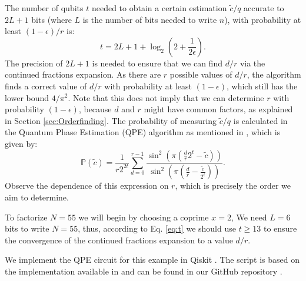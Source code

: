 \documentclass[aps,prl,twocolumn,superscriptaddress,groupedaddress]{revtex4}  %
\begin{document}
The number of qubits $t$ needed to obtain a certain estimation  $\tilde{c}/q$ accurate to $2L+1$ bits (where $L$ is the number of bits needed to write $n$), with probability at least $(1-\epsilon)/r$ is:
\begin{equation}\label{eq:t}
t=2L+1+ \log_2 \left(  2+\frac{1}{2\epsilon}\right).
\end{equation}
The precision of $2L+1$ is needed to ensure that we can find $d/r$ via the continued fractions expansion. As there are $r$ possible values of $d/r$, the algorithm finds a correct value of $d/r$  with probability at least $(1-\epsilon)$, which still has the lower bound $4/\pi^2$. Note that this does not imply that we can determine $r$ with probability $(1-\epsilon)$, because $d$ and $r$ might have common factors, as explained in Section \ref{sec:Orderfinding}. The probability of measuring $\tilde{c}/q$ is calculated in the Quantum Phase Estimation (QPE) algorithm as mentioned in \cite{Nielsen_Chuang_2010}, which is given by:
\begin{equation}
\mathbb{P}(\tilde{c})=\frac{1}{r2^{2t}}\sum_{d=0}^{r-1} \frac{\sin^2\left(\pi \left( \frac{d}{r}2^t -  \tilde{c} \right) \right)}{\sin^2\left(\pi \left( \frac{d}{r} -  \frac{\tilde{c}}{2^t} \right) \right)}.
\label{Ernesto's_Art}
\end{equation}
Observe the dependence of this expression on $r$, which is precisely the order we aim to determine.

To factorize $N=55$ we will begin by choosing a coprime $x=2$, 
We need $L=6$ bits to write $N=55$, thus, according to Eq. \eqref{eq:t} we should use $t \ge 13$ to ensure the convergence of the continued fractions expansion to a value $d/r$.

We implement the QPE circuit for this example in Qiskit \cite{qiskit2024}. The script is based on the implementation available in \cite{SirSergi0_AQM_Coursework_Group8} and can be found in our GitHub repository \cite{quantummasterbarcelonacode_factoring}. 


\end{document}
